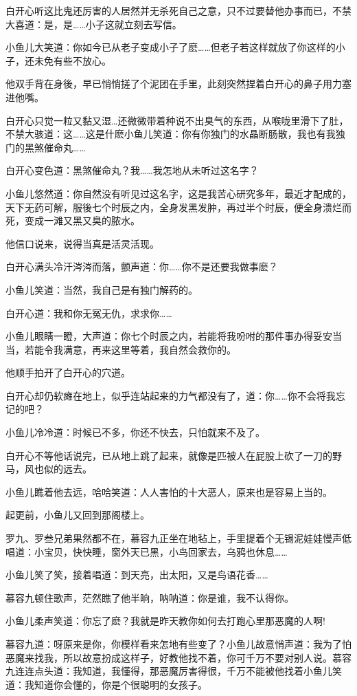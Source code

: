 \documentclass[12pt,oneside]{book}
\begin{document}
白开心听这比鬼还厉害的人居然并无杀死自己之意，只不过要替他办事而已，不禁大喜道：是，是\ldots\ldots 小子这就立刻去写信。

小鱼儿大笑道：你如今已从老子变成小子了麽\ldots\ldots 但老子若这样就放了你这样的小子，还未免有些不放心。

他双手背在身後，早已悄悄搓了个泥团在手里，此刻突然捏着白开心的鼻子用力塞进他嘴。

白开心只觉一粒又黏又湿\ldots 还微微带着种说不出臭气的东西，从喉咙里滑下了肚，不禁大骇道：这\ldots\ldots 这是什麽小鱼儿笑道：你有你独门的水晶断肠散，我也有我独门的黑煞催命丸\ldots\ldots{}

白开心变色道：黑煞催命丸？我\ldots\ldots 我怎地从未听过这名字？

小鱼儿悠然道：你自然没有听见过这名字，这是我苦心研究多年，最近才配成的，天下无药可解，服後七个时辰之内，全身发黑发肿，再过半个时辰，便全身溃烂而死，变成一滩又黑又臭的脓水。

他信口说来，说得当真是活灵活现。

白开心满头冷汗涔涔而落，颤声道：你\ldots\ldots 你不是还要我做事麽？

小鱼儿笑道：当然，我自己是有独门解药的。

白开心道：我和你无冤无仇，求求你\ldots\ldots{}

小鱼儿眼睛一瞪，大声道：你七个时辰之内，若能将我吩咐的那件事办得妥安当当，若能令我满意，再来这里等着，我自然会救你的。

他顺手拍开了白开心的穴道。

白开心却仍软瘫在地上，似乎连站起来的力气都没有了，道：你\ldots\ldots 你不会将我忘记的吧？

小鱼儿冷冷道：时候已不多，你还不快去，只怕就来不及了。

白开心不等他话说完，已从地上跳了起来，就像是匹被人在屁股上砍了一刀的野马，风也似的远去。

小鱼儿瞧着他去远，哈哈笑道：人人害怕的十大恶人，原来也是容易上当的。

起更前，小鱼儿又回到那阁楼上。

罗九、罗叁兄弟果然都不在，慕容九正坐在地毡上，手里提着个无锡泥娃娃慢声低唱道：小宝贝，快快睡，窗外天已黑，小鸟回家去，乌鸦也休息\ldots\ldots{}

小鱼儿笑了笑，接着唱道：到天亮，出太阳，又是鸟语花香\ldots\ldots{}

慕容九顿住歌声，茫然瞧了他半晌，呐呐道：你是谁，我不认得你。

小鱼儿柔声笑道：你忘了麽？我就是昨天教你如何去打跑心里那恶魔的人啊!

慕容九道：呀原来是你，你模样看来怎地有些变了？小鱼儿故意悄声道：我为了怕恶魔来找我，所以故意扮成这样子，好教他找不着，你可千万不要对别人说。慕容九连连点头道：我知道，我懂得，那恶魔厉害得很，千万不能被他找着小鱼儿笑道：我知道你会懂的，你是个很聪明的女孩子。
\end{document}
